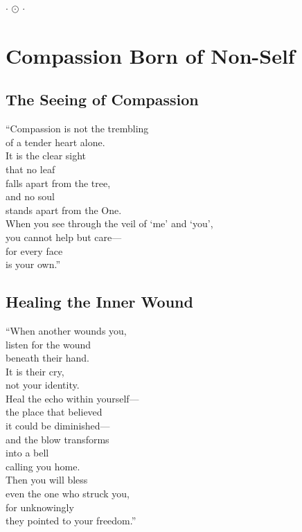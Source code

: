 \documentclass[10pt, openright]{book}
\newcommand{\sectionbreak}{\filbreak}
\newcommand{\ornament}{
    \vspace{1.5cm}
    \begin{center}
        \large \(\cdot\) \(\odot\) \(\cdot\)
    \end{center}
    \vspace{1.5cm}
}
\begin{document}
\ornament

\chapter{Compassion Born of Non-Self}\label{compassion-born-of-non-self}

\sectionbreak

\section{The Seeing of Compassion}\label{the-seeing-of-compassion}

``Compassion is not the trembling\\
of a tender heart alone.\\
It is the clear sight\\
that no leaf\\
falls apart from the tree,\\
and no soul\\
stands apart from the One.\\
When you see through the veil of `me' and `you',\\
you cannot help but care---\\
for every face\\
is your own.''

\sectionbreak

\section{Healing the Inner Wound}\label{healing-the-inner-wound}

``When another wounds you,\\
listen for the wound\\
beneath their hand.\\
It is their cry,\\
not your identity.\\
Heal the echo within yourself---\\
the place that believed\\
it could be diminished---\\
and the blow transforms\\
into a bell\\
calling you home.\\
Then you will bless\\
even the one who struck you,\\
for unknowingly\\
they pointed to your freedom.''
\end{document}
